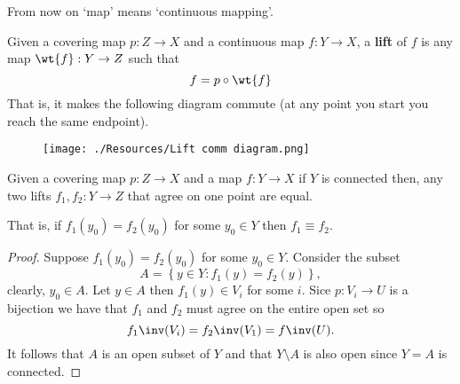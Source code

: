 \documentclass[12pt, a4paper]{article}
\begin{document}
\begin{mdnote}
    From now on `map' means `continuous mapping'.
\end{mdnote}

\begin{definition}
    Given a covering map \(p:Z \to X\) and a continuous map \(f:Y\to X\), a \textbf{lift} of \(f\) is any map \(\wt{f}: Y\to Z\) such that
    \[f = p\circ \wt{f}\]
    That is, it makes the following diagram commute (at any point you start you reach the same endpoint).
    \begin{figure}[H]
         \begin{center}
             \texttt{[image: ./Resources/Lift comm diagram.png]}
         \end{center}
    \end{figure}
\end{definition}

\begin{mdprop}
    Given a covering map \(p:Z \to X\) and a map \(f:Y \to X\) if \(Y\) is connected then, any two lifts \(f_1,f_2:Y\to Z\) that agree on one point are equal.
\end{mdprop}

\begin{mdnote}
    That is, if \(f_1(y_0)=f_2(y_0)\) for some \(y_0 \in Y\) then \(f_1 \equiv f_2\).
\end{mdnote}

\begin{proof}
    Suppose \(f_1(y_0) =f_2(y_0)\) for some \(y_0 \in Y\). Consider the subset 
    \[A = \left\{ y\in Y :f_1(y)=f_2(y) \right\},\]
    clearly, \(y_0 \in A\). Let \(y \in A\) then \(f_1(y) \in V_i\) for some \(i\). Sice \(p:V_i \to U\) is a bijection we have that \(f_1\) and \(f_2\) must agree on the entire open set so 
    \[f_1\inv(V_i)=f_2\inv(V_1)=f\inv(U).\]
    It follows that \(A\) is an open subset of \(Y\) and that \(Y\setminus A\) is also open since \(Y=A\) is connected.
\end{proof}
\end{document}
